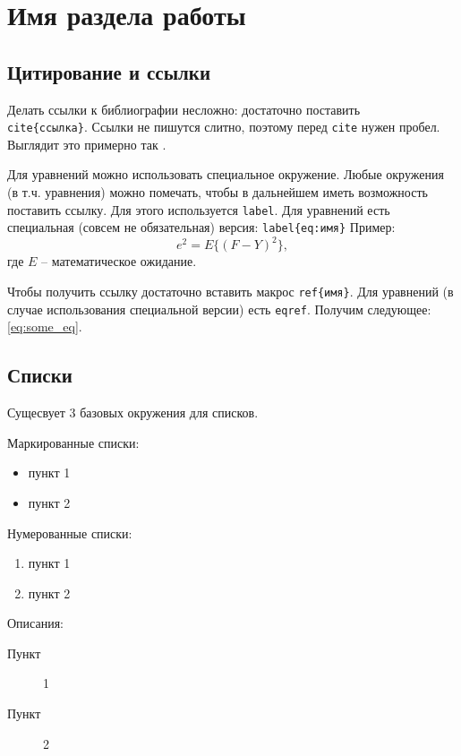 
\section{Имя раздела работы}

\subsection{Цитирование и ссылки}
Делать ссылки к библиографии несложно: достаточно поставить \texttt{\\cite\{ссылка\}}. Ссылки не пишутся слитно, поэтому перед \texttt{cite} нужен пробел. Выглядит это примерно так \cite{test}.

Для уравнений можно использовать специальное окружение. Любые окружения (в т.ч. уравнения) можно помечать, чтобы в дальнейшем иметь возможность поставить ссылку. Для этого используется \texttt{label}. Для уравнений есть специальная (совсем не обязательная) версия: \texttt{label\{eq:имя\}} Пример:
\begin{equation}\label{eq:some_eq}
    e^2 = E\{(F - Y)^2\},
\end{equation}
где $E$ -- математическое ожидание.

Чтобы получить ссылку достаточно вставить макрос \texttt{ref\{имя\}}. Для уравнений (в случае использования специальной версии) есть \texttt{eqref}. Получим следующее: \eqref{eq:some_eq}.

\subsection{Списки}

Сущесвует 3 базовых окружения для списков.

Маркированные списки:
\begin{itemize}
    \item пункт 1
    \item пункт 2
\end{itemize}

Нумерованные списки:
\begin{enumerate}
    \item пункт 1
    \item пункт 2
\end{enumerate}

Описания:
\begin{description}
    \item[Пункт] 1
    \item[Пункт] 2
\end{description}

